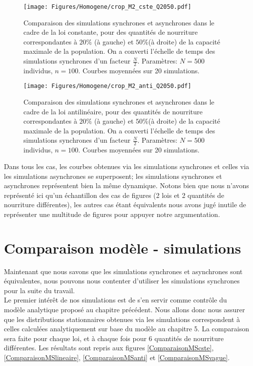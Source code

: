 \begin{figure}[h]
\centering
\texttt{[image: Figures/Homogene/crop\_M2\_cste\_Q2050.pdf]}
\caption{Comparaison des simulations synchrones et asynchrones dans le cadre de la loi constante, pour des quantités de nourriture correspondantes à $20\%$ (à gauche) et $50\%$(à droite) de la capacité maximale de la population. On a converti l'échelle de temps des simulations synchrones d'un facteur $\frac{N}{2}$. Paramètres: $N=500$ individus, $n = 100$. Courbes moyennées sur 20 simulations.}
\label{EquivalenceCste}
\end{figure}

\begin{figure}[h]
\centering
\texttt{[image: Figures/Homogene/crop\_M2\_anti\_Q2050.pdf]}
\caption{Comparaison des simulations synchrones et asynchrones dans le cadre de la loi antilinéaire, pour des quantités de nourriture correspondantes à $20\%$ (à gauche) et $50\%$(à droite) de la capacité maximale de la population. On a converti l'échelle de temps des simulations synchrones d'un facteur $\frac{N}{2}$. Paramètres: $N=500$ individus, $n = 100$. Courbes moyennées sur 20 simulations.}
\label{EquivalenceAnti}
\end{figure}


Dans tous les cas, les courbes obtenues via les simulations synchrones et celles via les simulations asynchrones se superposent; les simulations synchrones et asynchrones représentent bien la même dynamique. Notons bien que nous n'avons représenté ici qu'un échantillon des cas de figures (2 lois et 2 quantités de nourriture différentes), les autres cas étant équivalents nous avons jugé inutile de représenter une multitude de figures pour appuyer notre argumentation.

\section{Comparaison modèle - simulations}

Maintenant que nous savons que les simulations synchrones et asynchrones sont équivalentes, nous pouvons nous contenter d'utiliser les simulations synchrones pour la suite du travail. \\

Le premier intérêt de nos simulations est de s'en servir comme contrôle du modèle analytique proposé au chapitre précédent. Nous allons donc nous assurer que les distributions stationnaires obtenues via les simulations correspondent à celles calculées analytiquement sur base du modèle au chapitre 5. La comparaison sera faite pour chaque loi, et à chaque fois pour 6 quantités de nourriture différentes. Les résultats sont repris aux figures \ref{ComparaisonMScste}, \ref{ComparaisonMSlineaire}, \ref{ComparaisonMSanti} et \ref{ComparaisonMSvague}.

